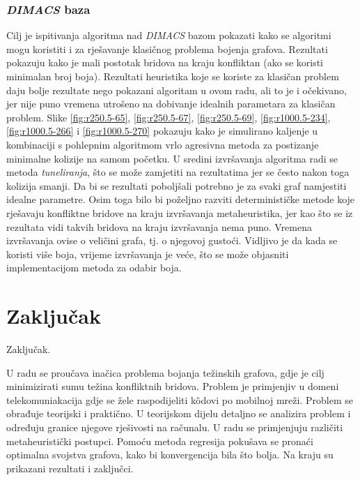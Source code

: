 \documentclass[times, utf8, diplomski, numeric]{fer}
\begin{document}
\subsection{\emph{DIMACS} baza}

Cilj je ispitivanja algoritma nad \emph{DIMACS} bazom pokazati kako se algoritmi mogu koristiti i za rješavanje klasičnog problema bojenja grafova. Rezultati pokazuju kako je mali postotak bridova na kraju konfliktan (ako se koristi minimalan broj boja). Rezultati heuristika koje se koriste za klasičan problem daju bolje rezultate nego pokazani algoritam u ovom radu, ali to je i očekivano, jer nije puno vremena utrošeno na dobivanje idealnih parametara za klasičan problem. Slike \ref{fig:r250.5-65}, \ref{fig:r250.5-67}, \ref{fig:r250.5-69}, \ref{fig:r1000.5-234}, \ref{fig:r1000.5-266} i \ref{fig:r1000.5-270} pokazuju kako je simulirano kaljenje u kombinaciji s pohlepnim algoritmom vrlo agresivna metoda za postizanje minimalne kolizije na samom početku. U sredini izvršavanja algoritma radi se metoda \emph{tuneliranja}, što se može zamjetiti na rezultatima jer se često nakon toga kolizija smanji. Da bi se rezultati poboljšali potrebno je za svaki graf namjestiti idealne parametre. Osim toga bilo bi poželjno razviti determinističke metode koje rješavaju konfliktne bridove na kraju izvršavanja metaheuristika, jer kao što se iz rezultata vidi takvih bridova na kraju izvršavanja nema puno. Vremena izvršavanja ovise o veličini grafa, tj. o njegovoj gustoći. Vidljivo je da kada se koristi više boja, vrijeme izvršavanja je veće, što se može objasniti implementacijom metoda za odabir boja.

\chapter{Zaključak}
Zaključak.




\begin{sazetak}

U radu se proučava inačica problema bojanja težinskih grafova, gdje je cilj minimizirati sumu težina konfliktnih bridova. Problem je primjenjiv u domeni telekomuniakacija gdje se žele raspodijeliti k\^{o}dovi po mobilnoj mreži. Problem se obrađuje teorijski i praktično. U teorijskom dijelu detaljno se analizira problem i određuju granice njegove rješivosti na računalu. U radu se primjenjuju različiti metaheuristički postupci. Pomoću metoda regresija pokušava se pronaći optimalna svojstva grafova, kako bi konvergencija bila što bolja. Na kraju su prikazani rezultati i zaključci.

\end{sazetak}
\end{document}
